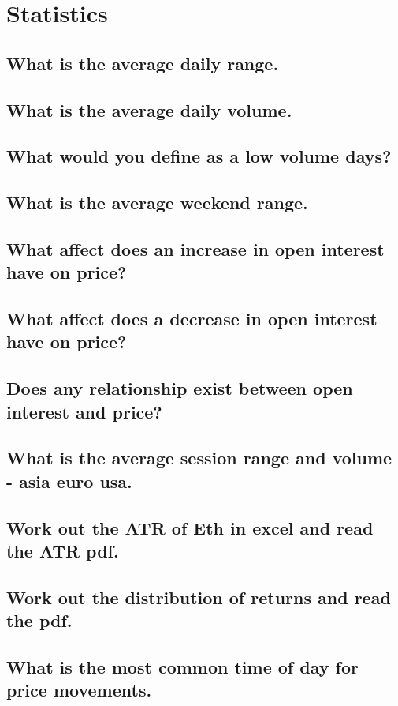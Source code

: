 \chapter{Statistics}
\label{stat}

\section{ What is the average daily range.}
\section{ What is the average daily volume.}
\section{ What would you define as a low volume days?}
\section{ What is the average weekend range.}
\section{ What affect does an increase in open interest have on price?}
\section{ What affect does a decrease in open interest have on price?}
\section{ Does any relationship exist between open interest and price?}
\section{ What is the average session range and volume - asia euro usa.}
\section{ Work out the ATR of Eth in excel and read the ATR pdf.}
\section{ Work out the distribution of returns and read the pdf.}
\section{ What is the most common time of day for price movements.}
